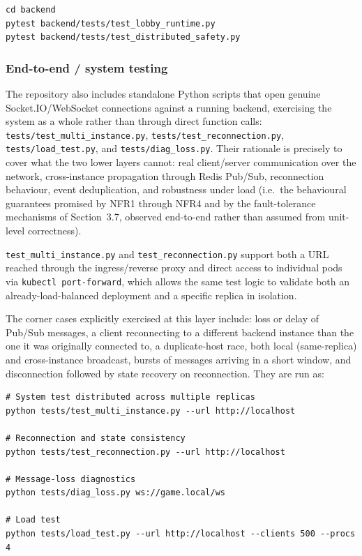 \documentclass{scrartcl}
\begin{document}
\begin{verbatim}
cd backend
pytest backend/tests/test_lobby_runtime.py
pytest backend/tests/test_distributed_safety.py
\end{verbatim}

\subsubsection{End-to-end / system testing}

The repository also includes standalone Python scripts that open genuine Socket.IO/WebSocket connections against a running backend, exercising the system as a whole rather than through direct function calls: \texttt{tests/test\_multi\_instance.py}, \texttt{tests/test\_reconnection.py}, \texttt{tests/load\_test.py}, and \texttt{tests/diag\_loss.py}. Their rationale is precisely to cover what the two lower layers cannot: real client/server communication over the network, cross-instance propagation through Redis Pub/Sub, reconnection behaviour, event deduplication, and robustness under load (i.e.\ the behavioural guarantees promised by NFR1 through NFR4 and by the fault-tolerance mechanisms of Section~3.7, observed end-to-end rather than assumed from unit-level correctness).

\texttt{test\_multi\_instance.py} and \texttt{test\_reconnection.py} support both a URL reached through the ingress/reverse proxy and direct access to individual pods via \texttt{kubectl port-forward}, which allows the same test logic to validate both an already-load-balanced deployment and a specific replica in isolation.

The corner cases explicitly exercised at this layer include: loss or delay of Pub/Sub messages, a client reconnecting to a different backend instance than the one it was originally connected to, a duplicate-host race, both local (same-replica) and cross-instance broadcast, bursts of messages arriving in a short window, and disconnection followed by state recovery on reconnection. They are run as:

\begin{verbatim}
# System test distributed across multiple replicas
python tests/test_multi_instance.py --url http://localhost

# Reconnection and state consistency
python tests/test_reconnection.py --url http://localhost

# Message-loss diagnostics
python tests/diag_loss.py ws://game.local/ws

# Load test
python tests/load_test.py --url http://localhost --clients 500 --procs 4
\end{verbatim}
\end{document}
